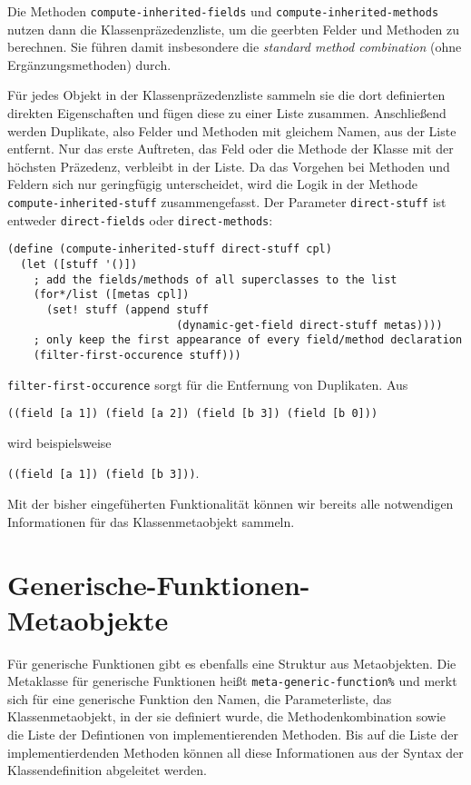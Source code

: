 Die Methoden \texttt{compute-inherited-fields} und \texttt{compute-inherited-methods} nutzen dann die Klassenpräzedenzliste, um die geerbten Felder und Methoden zu berechnen. Sie führen damit insbesondere die \textit{standard method combination} (ohne Ergänzungsmethoden) durch.

Für jedes Objekt in der Klassenpräzedenzliste sammeln sie die dort definierten direkten Eigenschaften und fügen diese zu einer Liste zusammen. Anschließend werden Duplikate, also Felder und Methoden mit gleichem Namen, aus der Liste entfernt. Nur das erste Auftreten, das Feld oder die Methode der Klasse mit der höchsten Präzedenz, verbleibt in der Liste. Da das Vorgehen bei Methoden und Feldern sich nur geringfügig unterscheidet, wird die Logik in der Methode \texttt{compute-inherited-stuff} zusammengefasst. Der Parameter \texttt{direct-stuff} ist entweder \texttt{{\textquotesingle}direct-fields} oder \texttt{{\textquotesingle}direct-methods}:

\begin{lstlisting}
(define (compute-inherited-stuff direct-stuff cpl)
  (let ([stuff '()])
    ; add the fields/methods of all superclasses to the list
    (for*/list ([metas cpl])
      (set! stuff (append stuff 
                          (dynamic-get-field direct-stuff metas))))
    ; only keep the first appearance of every field/method declaration
    (filter-first-occurence stuff)))
\end{lstlisting}

\texttt{filter-first-occurence} sorgt für die Entfernung von Duplikaten. Aus

\texttt{\textquotesingle((field [a 1]) (field [a 2]) (field [b 3]) (field [b 0]))}

wird beispielsweise

\texttt{\textquotesingle((field [a 1]) (field [b 3]))}.

Mit der bisher eingefüherten Funktionalität können wir bereits alle notwendigen Informationen für das Klassenmetaobjekt sammeln.

\section{Generische-Funktionen-Metaobjekte}
Für generische Funktionen gibt es ebenfalls eine Struktur aus Metaobjekten. Die Metaklasse für generische Funktionen heißt \texttt{meta-generic-function\%} und merkt sich für eine generische Funktion den Namen, die Parameterliste, das Klassenmetaobjekt, in der sie definiert wurde, die Methodenkombination sowie die Liste der Defintionen von implementierenden Methoden. Bis auf die Liste der implementierdenden Methoden können all diese Informationen aus der Syntax der Klassendefinition abgeleitet werden.

